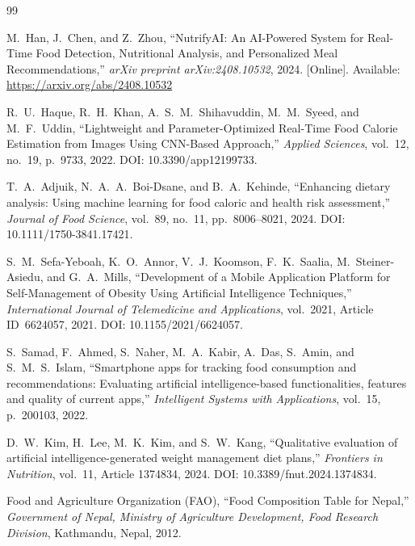 \documentclass[12pt,a4paper]{report}
\begin{document}
\begin{thebibliography}{99}

M.~Han, J.~Chen, and Z.~Zhou,
``NutrifyAI: An AI-Powered System for Real-Time Food Detection, Nutritional Analysis, and Personalized Meal Recommendations,''
\textit{arXiv preprint arXiv:2408.10532}, 2024.
[Online]. Available: \url{https://arxiv.org/abs/2408.10532}

R.~U.~Haque, R.~H.~Khan, A.~S.~M.~Shihavuddin, M.~M.~Syeed, and M.~F.~Uddin,
``Lightweight and Parameter-Optimized Real-Time Food Calorie Estimation from Images Using CNN-Based Approach,''
\textit{Applied Sciences}, vol.~12, no.~19, p.~9733, 2022.
DOI: 10.3390/app12199733.

T.~A.~Adjuik, N.~A.~A.~Boi-Dsane, and B.~A.~Kehinde,
``Enhancing dietary analysis: Using machine learning for food caloric and health risk assessment,''
\textit{Journal of Food Science}, vol.~89, no.~11, pp.~8006--8021, 2024.
DOI: 10.1111/1750-3841.17421.

S.~M.~Sefa-Yeboah, K.~O.~Annor, V.~J.~Koomson, F.~K.~Saalia, M.~Steiner-Asiedu, and G.~A.~Mills,
``Development of a Mobile Application Platform for Self-Management of Obesity Using Artificial Intelligence Techniques,''
\textit{International Journal of Telemedicine and Applications}, vol.~2021, Article ID~6624057, 2021.
DOI: 10.1155/2021/6624057.

S.~Samad, F.~Ahmed, S.~Naher, M.~A.~Kabir, A.~Das, S.~Amin, and S.~M.~S.~Islam,
``Smartphone apps for tracking food consumption and recommendations: Evaluating artificial intelligence-based functionalities, features and quality of current apps,''
\textit{Intelligent Systems with Applications}, vol.~15, p.~200103, 2022.

D.~W.~Kim, H.~Lee, M.~K.~Kim, and S.~W.~Kang,
``Qualitative evaluation of artificial intelligence-generated weight management diet plans,''
\textit{Frontiers in Nutrition}, vol.~11, Article 1374834, 2024.
DOI: 10.3389/fnut.2024.1374834.

Food and Agriculture Organization (FAO),
``Food Composition Table for Nepal,''
\textit{Government of Nepal, Ministry of Agriculture Development, Food Research Division}, Kathmandu, Nepal, 2012.


\end{thebibliography}
\end{document}
